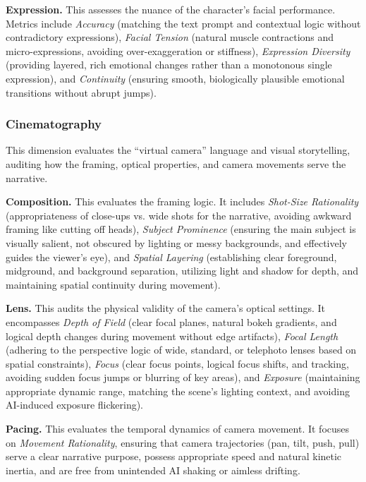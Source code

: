 \documentclass{llmxive}
\begin{document}
\noindent
\textbf{Expression.} This assesses the nuance of the character's facial performance. Metrics include \textit{Accuracy} (matching the text prompt and contextual logic without contradictory expressions), \textit{Facial Tension} (natural muscle contractions and micro-expressions, avoiding over-exaggeration or stiffness), \textit{Expression Diversity} (providing layered, rich emotional changes rather than a monotonous single expression), and \textit{Continuity} (ensuring smooth, biologically plausible emotional transitions without abrupt jumps).

\subsubsection{Cinematography}
\noindent
This dimension evaluates the ``virtual camera'' language and visual storytelling, auditing how the framing, optical properties, and camera movements serve the narrative.

\noindent
\textbf{Composition.} This evaluates the framing logic. It includes \textit{Shot-Size Rationality} (appropriateness of close-ups vs. wide shots for the narrative, avoiding awkward framing like cutting off heads), \textit{Subject Prominence} (ensuring the main subject is visually salient, not obscured by lighting or messy backgrounds, and effectively guides the viewer's eye), and \textit{Spatial Layering} (establishing clear foreground, midground, and background separation, utilizing light and shadow for depth, and maintaining spatial continuity during movement).

\noindent
\textbf{Lens.} This audits the physical validity of the camera's optical settings. It encompasses \textit{Depth of Field} (clear focal planes, natural bokeh gradients, and logical depth changes during movement without edge artifacts), \textit{Focal Length} (adhering to the perspective logic of wide, standard, or telephoto lenses based on spatial constraints), \textit{Focus} (clear focus points, logical focus shifts, and tracking, avoiding sudden focus jumps or blurring of key areas), and \textit{Exposure} (maintaining appropriate dynamic range, matching the scene's lighting context, and avoiding AI-induced exposure flickering).

\noindent
\textbf{Pacing.} This evaluates the temporal dynamics of camera movement. It focuses on \textit{Movement Rationality}, ensuring that camera trajectories (pan, tilt, push, pull) serve a clear narrative purpose, possess appropriate speed and natural kinetic inertia, and are free from unintended AI shaking or aimless drifting.
\end{document}
